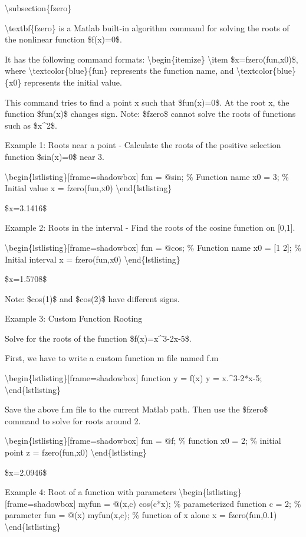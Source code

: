 \documentclass[10pt,math=newtx,citestyle=gb7714-2015,bibstyle=gb7714-2015]{elegantbook}
\begin{document}
	\textbackslash{}subsection\{fzero\}
	
	\textbackslash{}textbf\{fzero\} is a Matlab built-in algorithm command for solving the roots of the nonlinear function \$f(x)=0\$.
	
	It has the following command formats:
	\textbackslash{}begin\{itemize\}
	\textbackslash{}item \$x=fzero(fun,x0)\$, where \textbackslash{}textcolor\{blue\}\{fun\} represents the function name, and \textbackslash{}textcolor\{blue\}\{x0\} represents the initial value.
	
	This command tries to find a point x such that \$fun(x)=0\$. At the root x, the function \$fun(x)\$ changes sign. Note: \$fzero\$ cannot solve the roots of functions such as \$x\^{}2\$.
	
	Example 1: Roots near a point - Calculate the roots of the positive selection function \$sin(x)=0\$ near 3.
	
	\textbackslash{}begin\{lstlisting\}[frame=shadowbox]
	fun = @sin; \% Function name
	x0 = 3; \% Initial value
	x = fzero(fun,x0)
	\textbackslash{}end\{lstlisting\}
	
	\$x=3.1416\$
	
	Example 2: Roots in the interval - Find the roots of the cosine function on [0,1].
	
	\textbackslash{}begin\{lstlisting\}[frame=shadowbox]
	fun = @cos; \% Function name
	x0 = [1 2]; \% Initial interval
	x = fzero(fun,x0)
	\textbackslash{}end\{lstlisting\}
	
	\$x=1.5708\$
	
	Note: \$cos(1)\$ and \$cos(2)\$ have different signs.
	
	Example 3: Custom Function Rooting
	
	Solve for the roots of the function \$f(x)=x\^{}3-2x-5\$.
	
	First, we have to write a custom function m file named f.m
	
	\textbackslash{}begin\{lstlisting\}[frame=shadowbox]
	function y = f(x)
	y = x.\^{}3-2*x-5;
	\textbackslash{}end\{lstlisting\}
	
	Save the above f.m file to the current Matlab path. Then use the \$fzero\$ command to solve for roots around 2.
	
	\textbackslash{}begin\{lstlisting\}[frame=shadowbox]
	fun = @f; \% function
	x0 = 2; \% initial point
	z = fzero(fun,x0)
	\textbackslash{}end\{lstlisting\}
	
	\$x=2.0946\$
	
	Example 4: Root of a function with parameters
	\textbackslash{}begin\{lstlisting\}[frame=shadowbox]
	myfun = @(x,c) cos(c*x);  \% parameterized function
	c = 2;                    \% parameter
	fun = @(x) myfun(x,c);    \% function of x alone
	x = fzero(fun,0.1)
	\textbackslash{}end\{lstlisting\}
	
\end{document}
